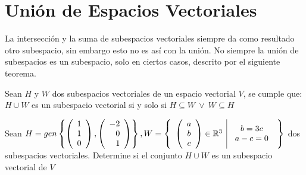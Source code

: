 \newpage

\section{Unión de Espacios Vectoriales}
La intersección y la suma de subespacios vectoriales siempre da como resultado otro subespacio, sin embargo esto no es así con la unión. No siempre la unión de subespacios es un subespacio, solo en ciertos casos, descrito por el siguiente teorema.
\begin{theorem}
Sean $H$ y $W$ dos subespacios vectoriales de un espacio vectorial $V$, se cumple que: $H \cup W$ es un subespacio vectorial si y solo si $H \subseteq W \ \lor \ W \subseteq H$
\end{theorem}

\begin{ejemplo}
Sean $H = gen \left\{\left( \begin{array}{r} 1\\ 1\\ 0 \end{array} \right) ,\left( \begin{array}{r} -2\\ 0\\ 1 \end{array} \right)  \right\} , W= \left\{\begin{array}{c|c} {\left( \begin{array}{c} a\\ b\\ c \end{array}\right) \in \mathbb{R}^3 }&{\begin{array}{c}
    b = 3c\\
    a-c=0
\end{array}} \end{array} \right\}$ dos subespacios vectoriales. Determine si el conjunto $H \cup W$ es un subespacio vectorial de $V$
\end{ejemplo}
